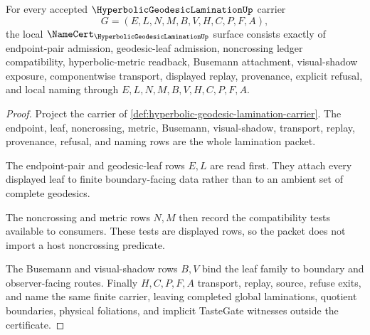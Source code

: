 \begin{theorem}
\label{thm:hyperbolic-geodesic-lamination-namecert-obligations}
For every accepted $\HyperbolicGeodesicLaminationUp$ carrier
$$
G=(E,L,N,M,B,V,H,C,P,F,A),
$$
the local $\NameCert_{\HyperbolicGeodesicLaminationUp}$ surface consists exactly of endpoint-pair admission, geodesic-leaf admission, noncrossing ledger compatibility, hyperbolic-metric readback, Busemann attachment, visual-shadow exposure, componentwise transport, displayed replay, provenance, explicit refusal, and local naming through $E,L,N,M,B,V,H,C,P,F,A$.
\end{theorem}
\begin{proof}
Project the carrier of \autoref{def:hyperbolic-geodesic-lamination-carrier}. The endpoint, leaf, noncrossing, metric, Busemann, visual-shadow, transport, replay, provenance, refusal, and naming rows are the whole lamination packet.

The endpoint-pair and geodesic-leaf rows $E,L$ are read first. They attach every displayed leaf to finite boundary-facing data rather than to an ambient set of complete geodesics.

The noncrossing and metric rows $N,M$ then record the compatibility tests available to consumers. These tests are displayed rows, so the packet does not import a host noncrossing predicate.

The Busemann and visual-shadow rows $B,V$ bind the leaf family to boundary and observer-facing routes. Finally $H,C,P,F,A$ transport, replay, source, refuse exits, and name the same finite carrier, leaving completed global laminations, quotient boundaries, physical foliations, and implicit TasteGate witnesses outside the certificate.
\end{proof}


